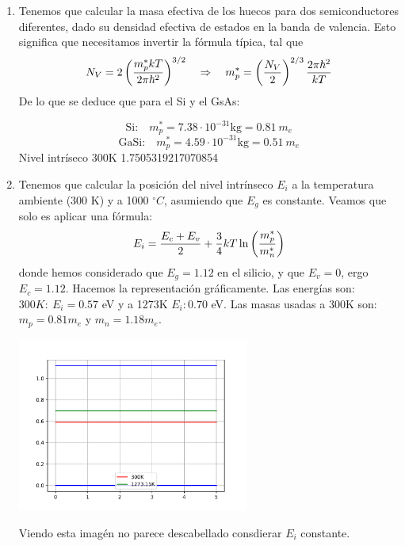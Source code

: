 \begin{enumerate}[label=\alph*)]
	\item	Tenemos que calcular la masa efectiva de los huecos para dos semiconductores diferentes, dado su densidad efectiva de estados en la banda de valencia. Esto significa que necesitamos invertir la fórmula típica, tal que
		  \begin{equation}
			  N_V = 2 \left( \frac{m_p^* kT}{2\pi\hbar^2} \right)^{3/2} \quad \Rightarrow \quad m_p^* = \left( \frac{N_V}{2} \right)^{2/3} {\frac{2 \pi \hbar^2}{kT}}
		  \end{equation}
		  De lo que se deduce que para el Si y el GsAs:

		  \begin{equation}
			  \text{Si:} \quad m_p^* = 7.38\cdot10^{-31} \text{kg} = 0.81 \ {m}_e
		  \end{equation}
		  \begin{equation}
			  \text{GaSi:}\quad m_p^* = 4.59 \cdot10^{-31} \text{kg} = 0.51 \ {m}_e
		  \end{equation}
		  Nivel intríseco 300K 1.7505319217070854
	\item Tenemos que calcular la posición del nivel intrínseco $E_i$ a la temperatura ambiente (300 K) y a 1000 $^\circ C$, asumiendo que $E_g$ es constante. Veamos que solo es aplicar una fórmula:
		  \begin{equation}
			  E_i = \frac{E_c+E_v}{2} + \frac{3}{4} kT \ln\left( \frac{m_p^*}{m_n^*} \right)
		  \end{equation}
		  donde hemos considerado que $E_g=1.12$ en el silicio, y que $E_v=0$, ergo $E_c=1.12$. Hacemos la representación gráficamente. Las energías son: $300K: \ E_i=0.57$ eV y a 1273K $E_i: 0.70$ eV. Las masas usadas a 300K son: $m_p=0.81m_e$ y $m_n=1.18m_e$.
		  \begin{center}
			  \includegraphics[width=0.6\textwidth]{Ejercicios/Ch_01/Ejercicio_01_5.pdf}
		  \end{center}
		  Viendo esta imagén no parece descabellado consdierar $E_i$ constante.
\end{enumerate}


